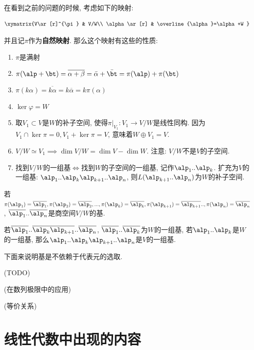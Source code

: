 在看到之前的问题的时候, 考虑如下的映射:

\[
\xymatrix{V\ar[r]^{\pi} & V/W\\
\alpha\ar[r] & \overline{\alpha}=\alpha+W
}
\]

并且记$\pi$作为\textbf{自然映射}. 那么这个映射有这些的性质:
\begin{enumerate}
\item $\pi$是满射
\item $\pi(\alp+\bt)=\overline{\alpha+\beta}=\bar{\alpha}+\bar{\bt}=\pi(\alp)+\pi(\bt)$
\item $\pi(k\alpha)=\overline{k\alpha}=k\overline{\alpha}=k\pi(\alpha)$
\item $\ker\varphi=W$
\item 取$V_{1}\subset V$是$W$的补子空间, 使得$\pi|_{V_{1}}:V_{1}\to V/W$是线性同构.
因为$V_{1}\cap\ker\pi=0,V_{1}+\ker\pi=V$, 意味着$W\oplus V_{1}=V$.
\item $V/W\simeq V_{1}\implies\dim V/W=\dim V-\dim W$. 注意: $V/W$不是$V$的子空间. 
\item 找到$V/W$的一组基$\iff$找到$W$的子空间的一组基, 记作$\alp_{1}..\alp_{k}$. 扩充为$V$的一组基:
$\alp_{1}..\alp_{k}\alp_{k+1}..\alp_{n}$, 则$L(\alp_{k+1}..\alp_{n})$为$W$的补子空间. 
\end{enumerate}
\begin{prop}
若$\pi(\alp_{1})=\overline{\alp_{1}},\pi(\alp_{2})=\overline{\alp_{2}},...,\pi(\alp_{k})=\overline{\alp_{k}},\pi(\alp_{k+1})=\overline{\alp_{k+1}}..,\pi(\alp_{n})=\overline{\alp_{n}}$,
$\overline{\alp_{1}}..\overline{\alp_{n}}$是商空间$V/W$的基.
\end{prop}
%
\begin{prop}
若$\overline{\alp_{1}}..\overline{\alp_{k}}\overline{\alp_{k+1}}..\overline{\alp_{n}}$,
$\overline{\alp_{1}}..\overline{\alp_{k}}$为$W$的一组基, 若$\alp_{1}..\alp_{k}$是$W$的一组基,
那么$\alp_{1}..\alp_{k}\alp_{k+1}..\alp_{n}$是$V$的一组基. 
\end{prop}
%
下面来说明基是不依赖于代表元的选取. 

(TODO)
\begin{example}
(在数列极限中的应用)
\end{example}
%
\begin{defn}
(等价关系)
\end{defn}

\section{线性代数中出现的内容}

